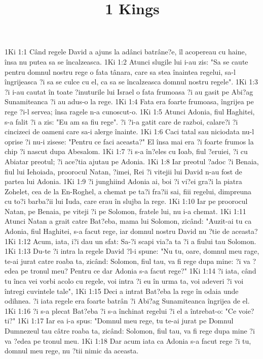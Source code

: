 

\title{1 Kings}

1Ki 1:1  Când regele David a ajuns la adânci batrâne?e, îl acopereau cu haine, însa nu putea sa se încalzeasca.
1Ki 1:2  Atunci slugile lui i-au zis: "Sa se caute pentru domnul nostru rege o fata tânara, care sa stea înaintea regelui, sa-l îngrijeasca ?i sa se culce cu el, ca sa se încalzeasca domnul nostru regele".
1Ki 1:3  ?i i-au cautat în toate ?inuturile lui Israel o fata frumoasa ?i au gasit pe Abi?ag Sunamiteanca ?i au adus-o la rege.
1Ki 1:4  Fata era foarte frumoasa, îngrijea pe rege ?i-l servea; însa ragele n-a cunoscut-o.
1Ki 1:5  Atunci Adonia, fiul Haghitei, s-a falit ?i a zis: "Eu am sa fiu rege". ?i ?i-a gatit care de razboi, calare?i ?i cincizeci de oameni care sa-i alerge înainte.
1Ki 1:6  Caci tatal sau niciodata nu-l oprise ?i nu-i zisese: "Pentru ce faci aceasta?" El însa mai era ?i foarte frumos la chip ?i nascut dupa Abesalom.
1Ki 1:7  ?i s-a în?eles cu Ioab, fiul ?eruiei, ?i cu Abiatar preotul; ?i ace?tia ajutau pe Adonia.
1Ki 1:8  Iar preotul ?adoc ?i Benaia, fiul lui Iehoiada, proorocul Natan, ?imei, Rei ?i vitejii lui David n-au fost de partea lui Adonia.
1Ki 1:9  ?i junghiind Adonia ai, boi ?i vi?ei gra?i la piatra Zohelet, cea de la En-Roghel, a chemat pe ta?i fra?ii sai, fiii regelui, dimpreuna cu to?i barba?ii lui Iuda, care erau în slujba la rege.
1Ki 1:10  Iar pe proorocul Natan, pe Benaia, pe viteji ?i pe Solomon, fratele lui, nu i-a chemat.
1Ki 1:11  Atunci Natan a grait catre Bat?eba, mama lui Solomon, zicând: "Auzit-ai tu ca Adonia, fiul Haghitei, s-a facut rege, iar domnul nostru David nu ?tie de aceasta?
1Ki 1:12  Acum, iata, i?i dau un sfat: Sa-?i scapi via?a ta ?i a fiului tau Solomon.
1Ki 1:13  Du-te ?i intra la regele David ?l-i spune: "Nu tu, oare, domnul meu rage, te-ai jurat catre roaba ta, zicând: Solomon, fiul tau, va fi rege dupa mine: ?i va ?edea pe tronul meu? Pentru ce dar Adonia s-a facut rege?"
1Ki 1:14  ?i iata, când tu înca vei vorbi acolo cu regele, voi intra ?i eu în urma ta, voi adeveri ?i voi întregi cuvintele tale",
1Ki 1:15  Deci a intrat Bat?eba la rege în odaia unde odihnea. ?i iata regele era foarte batrân ?i Abi?ag Sunamiteanca îngrijea de el.
1Ki 1:16  ?i s-a plecat Bat?eba ?i s-a închinat regelui ?i el a întrebat-o: "Ce voie?ti?"
1Ki 1:17  Iar ea i-a spus: "Domnul meu rege, tu te-ai jurat pe Domnul Dumnezeul tau câtre roaba ta, zicând: Solomon, fiul tau, va fi rege dupa mine ?i va ?edea pe tronul meu.
1Ki 1:18  Dar acum iata ca Adonia s-a facut rege ?i tu, domnul meu rege, nu ?tii nimic da aceasta.
